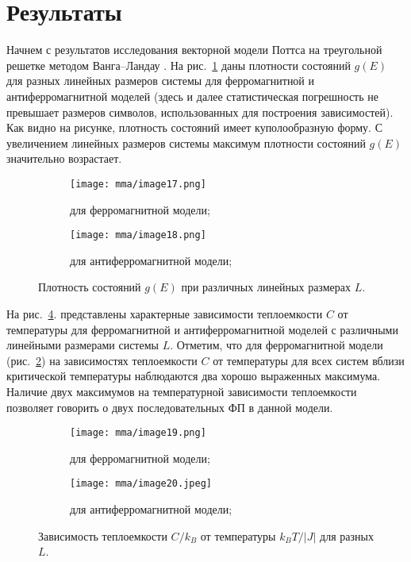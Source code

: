 \section{Результаты}
Начнем с результатов исследования векторной модели Поттса на треугольной решетке методом Ванга--Ландау \cite{bib:mma-9, bib:mma-10, bib:mma-11}.
На рис.~\ref{fig:mma-2} даны плотности состояний $g(E)$ для разных линейных размеров системы для ферромагнитной и антиферромагнитной моделей (здесь и далее статистическая погрешность не превышает размеров символов, использованных для построения зависимостей). Как видно на рисунке, плотность состояний имеет куполообразную форму. С увеличением линейных размеров системы максимум плотности состояний $g(E)$ значительно возрастает.
\begin{figure}[ht]
    \centering
    \begin{subfigure}{0.45\textwidth}
        \texttt{[image: mma/image17.png]}
        \caption{для ферромагнитной модели;}
    \end{subfigure}
    \begin{subfigure}{0.45\textwidth}
        \texttt{[image: mma/image18.png]}
        \caption{для антиферромагнитной модели;}
    \end{subfigure}
    \caption{Плотность состояний $g(E)$ при различных линейных размерах $L$.}
    \label{fig:mma-2}
\end{figure}

На рис.~\ref{fig:mma-3}. представлены характерные зависимости теплоемкости $C$ от температуры для ферромагнитной и антиферромагнитной моделей с различными линейными размерами системы $L$. Отметим, что для ферромагнитной модели (рис.~\ref{fig:mma-3a}) на зависимостях теплоемкости $C$ от температуры для всех систем вблизи критической температуры наблюдаются два хорошо выраженных максимума. Наличие двух максимумов на температурной зависимости теплоемкости позволяет говорить о двух последовательных ФП в данной модели.
\begin{figure}[ht]
    \centering
    \begin{subfigure}{0.45\textwidth}
        \texttt{[image: mma/image19.png]}
        \caption{для ферромагнитной модели;}
        \label{fig:mma-3a}
    \end{subfigure}
    \begin{subfigure}{0.45\textwidth}
        \texttt{[image: mma/image20.jpeg]}
        \caption{для антиферромагнитной модели;}
        \label{fig:mma-3b}
    \end{subfigure}
    \caption{Зависимость теплоемкости $C/k_B$ от температуры $k_B T/ \left|J\right|$ для разных $L$.}
    \label{fig:mma-3}
\end{figure}

